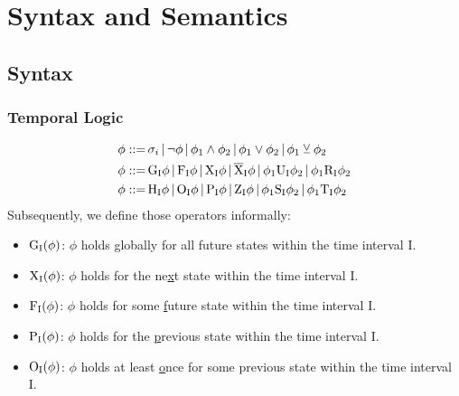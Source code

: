 

\section{Syntax and Semantics} 
\label{sec:syntax_semantics}

\subsection{Syntax}

%
%

\subsubsection{Temporal Logic}

\begin{align*}
\phi ::= \, & \sigma_i \,|\, \neg \phi \,|\, \phi_1 \land \phi_2 \,|\, \phi_1 \lor \phi_2 \,|\, \phi_1 \veebar  \phi_2  \\
\phi ::= \,	& \text{G}_\text{I}\phi \,|\, \text{F}_\text{I}\phi \,|\, \text{X}_\text{I}\phi \,|\, \overline{\text{X}}_\text{I}\phi  \,|\, \phi_1 \text{U}_\text{I} \phi_2 \,|\, \phi_1 \text{R}_\text{I} \phi_2 \\
\phi ::= \,	& \text{H}_\text{I}\phi \,|\, \text{O}_\text{I}\phi  \,|\,  \text{P}_\text{I}\phi \,|\,  \text{Z}_\text{I}\phi \,|\, \phi_1 \text{S}_\text{I} \phi_2 \,|\, \phi_1 \text{T}_\text{I} \phi_2 \\
\end{align*}
Subsequently, we define those operators informally:
\begin{itemize}
	\item $\text{G}_\text{I}(\phi)$: $\phi$ holds \underline{g}lobally for all future states within the time interval I.
	\item $\text{X}_\text{I}(\phi)$: $\phi$ holds for the ne\underline{x}t state within the time interval I.
	\item $\text{F}_\text{I}(\phi)$: $\phi$ holds for some \underline{f}uture state within the time interval I.
	\item $\text{P}_\text{I}(\phi)$: $\phi$ holds for the \underline{p}revious state within the time interval I.
	\item $\text{O}_\text{I}(\phi)$: $\phi$ holds at least \underline{o}nce for some previous state within the time interval I.
\end{itemize}

